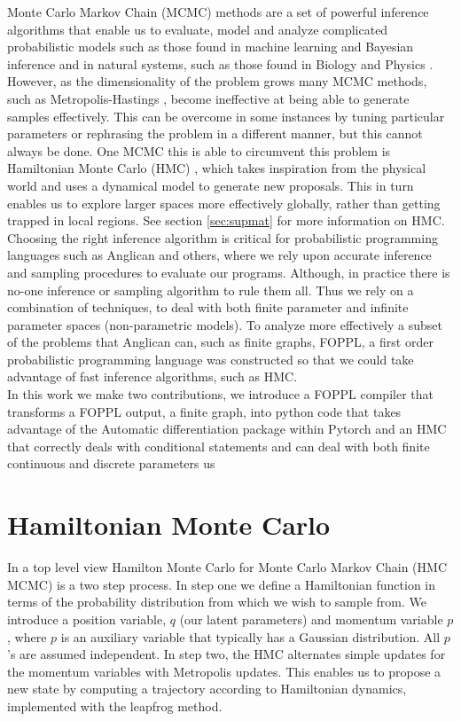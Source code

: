 \documentclass[twoside]{article}
\begin{document}
Monte Carlo Markov Chain (MCMC) methods are a set of powerful inference algorithms \citep{berg2008markov} that enable us to evaluate, model and analyze complicated probabilistic models such as those found in machine learning and Bayesian inference \citep{andrieu2003introduction} and in natural systems, such as those found in Biology \citep{sorensen2007likelihood} and Physics \citep{duane1987hybrid}. 
However, as the dimensionality of the problem grows many MCMC methods, such as Metropolis-Hastings \citep{hastings1970monte},  become ineffective at being able to generate samples effectively. This can be overcome in some instances by tuning particular parameters or rephrasing the problem in a different manner, but this cannot always be done. One MCMC this is able to circumvent this problem is Hamiltonian Monte Carlo (HMC) \citep{neal2011mcmc}\citep{duane1987hybrid}, which takes inspiration from the physical world and uses a dynamical model to generate new proposals. This in turn enables us to explore larger spaces more effectively globally, rather than getting trapped in local regions. See section \ref{sec:supmat} for more information on HMC. \\
Choosing the right inference algorithm is critical for probabilistic programming languages \citep{tolpin2015probabilistic} such as Anglican \citep{wood2014new} and others, where we rely upon accurate inference and sampling procedures to evaluate our programs. Although, in practice there is no-one inference or sampling algorithm to rule them all. Thus we rely on a combination of techniques, to deal with both finite parameter and infinite parameter spaces (non-parametric models). To analyze more effectively a subset of the problems that Anglican can, such as finite graphs, FOPPL, a first order probabilistic programming language was constructed so that we could take advantage of fast inference algorithms, such as HMC.\\
In this work we make two contributions, we introduce a FOPPL compiler that transforms a FOPPL output, a finite graph, into python code that takes advantage of the Automatic differentiation package within Pytorch \citep{pytorch} and an HMC that correctly deals with conditional statements and can deal with both finite continuous and discrete parameters us


\section{Hamiltonian Monte Carlo}
In a top level view Hamilton Monte Carlo for Monte Carlo Markov Chain (HMC MCMC) is a two step process. In step one we define a Hamiltonian function in terms of the probability distribution from which we wish to sample from. We introduce a position variable, $q$ (our latent parameters) and momentum variable $p$, where $p$ is an auxiliary variable that typically has a Gaussian distribution.  All $p$'s are assumed independent. 
In step two, the HMC alternates simple updates for the momentum variables with Metropolis updates. This enables us to propose a new state by computing a trajectory according to Hamiltonian dynamics, implemented with the leapfrog method. 
\end{document}
